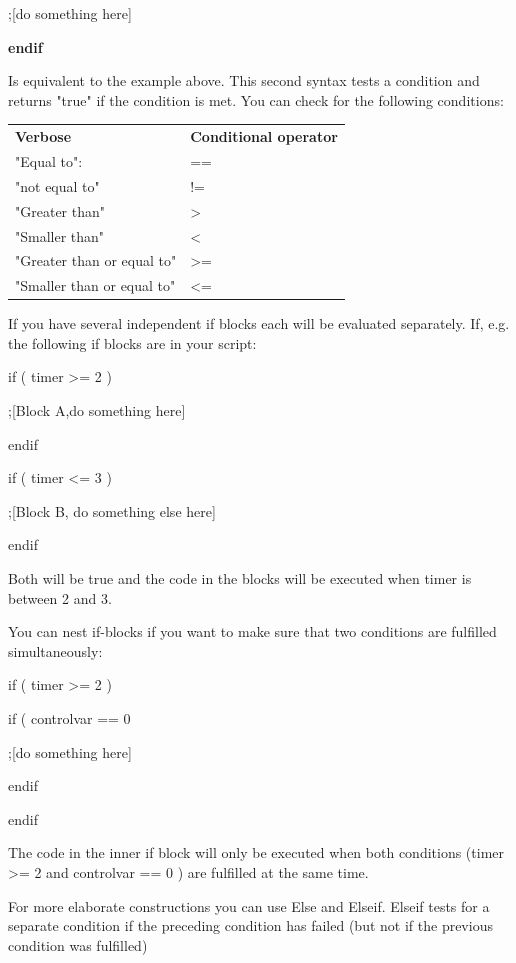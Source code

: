 \documentclass[
]{article}
\begin{document}
;{[}do something here{]}

\textbf{endif}

Is equivalent to the example above. This second syntax tests a condition
and returns "true" if the condition is met. You can check for the
following conditions:

\begin{longtable}[]{@{}
  >{\raggedright\arraybackslash}p{}
  >{\raggedright\arraybackslash}p{}@{}}
\toprule
\endhead
\textbf{Verbose} & \textbf{Conditional operator} \\
"Equal to": & == \\
"not equal to" & != \\
"Greater than" & \textgreater{} \\
"Smaller than" & \textless{} \\
"Greater than or equal to" & \textgreater= \\
"Smaller than or equal to" & \textless= \\
\bottomrule
\end{longtable}

If you have several independent if blocks each will be evaluated
separately. If, e.g. the following if blocks are in your script:

if ( timer \textgreater= 2 )

;{[}Block A,do something here{]}

endif

if ( timer \textless= 3 )

;{[}Block B, do something else here{]}

endif

Both will be true and the code in the blocks will be executed when timer
is between 2 and 3.

You can nest if-blocks if you want to make sure that two conditions are
fulfilled simultaneously:

if ( timer \textgreater= 2 )

if ( controlvar == 0

;{[}do something here{]}

endif

endif

The code in the inner if block will only be executed when both
conditions (timer \textgreater= 2 and controlvar == 0 ) are fulfilled at
the same time.

For more elaborate constructions you can use Else and Elseif. Elseif
tests for a separate condition if the preceding condition has failed
(but not if the previous condition was fulfilled)
\end{document}
